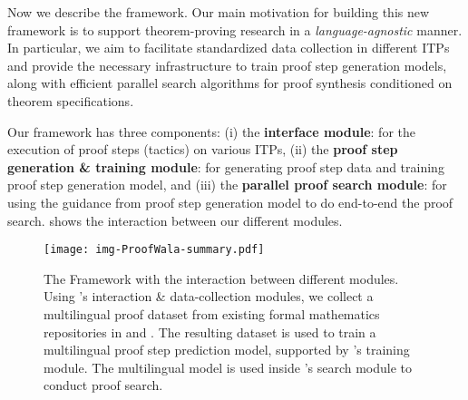 \newcommand{\HuggingFace}[0]{\textsc{HuggingFace}\xspace}

Now we describe the {\proofwala} framework. Our main motivation for building this new framework is to support theorem-proving research in a \emph{language-agnostic} manner. In particular, we aim to facilitate standardized data collection in different ITPs and provide the necessary infrastructure to train proof step generation models, along with efficient parallel search algorithms for proof synthesis conditioned on theorem specifications. 

Our framework has three components: 
(i) the \textbf{interface module}: for the execution of proof steps (tactics) on various ITPs, (ii) the \textbf{proof step generation \& training module}: for generating proof step data and training proof step generation model, and (iii) the \textbf{parallel proof search module}: for using the guidance from proof step generation model to do end-to-end the proof search.  shows the interaction between our different modules.


\begin{figure*}
    \centering
    \texttt{[image: img-ProofWala-summary.pdf]}
    \caption{The \proofwala\;Framework with the interaction between different modules. Using \proofwala's interaction \& data-collection modules, we collect a multilingual proof dataset from existing formal mathematics repositories in \lean\; and \coq. The resulting dataset is used to train a multilingual proof step prediction model, supported by \proofwala's training module. The multilingual model is used inside \proofwala's search module to conduct proof search.}
    \label{fig:proofwala-summary}
\end{figure*}

